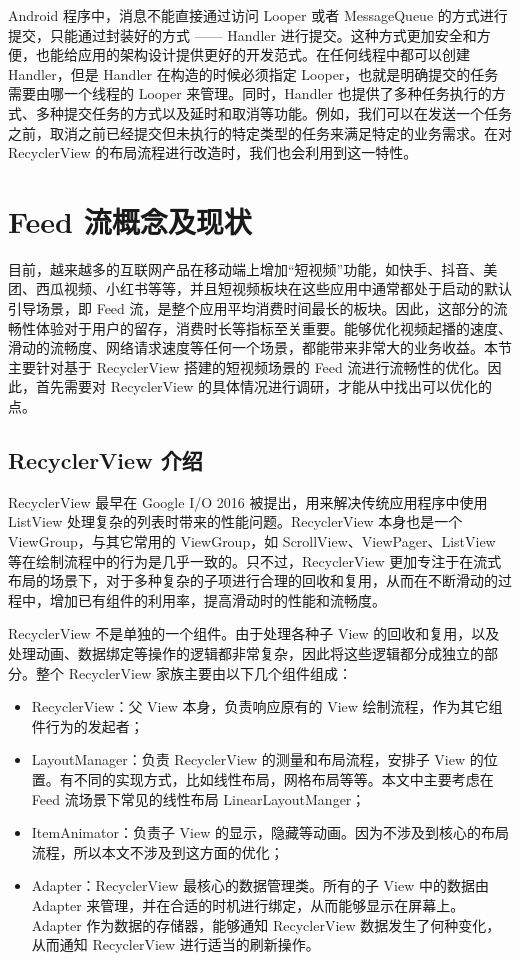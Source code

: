 Android 程序中，消息不能直接通过访问 Looper 或者 MessageQueue 的方式进行提交，只能通过封装好的方式 —— Handler 进行提交。这种方式更加安全和方便，也能给应用的架构设计提供更好的开发范式。在任何线程中都可以创建 Handler，但是 Handler 在构造的时候必须指定 Looper，也就是明确提交的任务需要由哪一个线程的 Looper 来管理\cite{fan2018efficiently}。同时，Handler 也提供了多种任务执行的方式、多种提交任务的方式以及延时和取消等功能。例如，我们可以在发送一个任务之前，取消之前已经提交但未执行的特定类型的任务来满足特定的业务需求。在对 RecyclerView 的布局流程进行改造时，我们也会利用到这一特性。

\section{Feed 流概念及现状}

目前，越来越多的互联网产品在移动端上增加“短视频”功能，如快手、抖音、美团、西瓜视频、小红书等等，并且短视频板块在这些应用中通常都处于启动的默认引导场景，即 Feed 流，是整个应用平均消费时间最长的板块\cite{谢新洲2019短视频火爆背后的问题分析}。因此，这部分的流畅性体验对于用户的留存，消费时长等指标至关重要。能够优化视频起播的速度、滑动的流畅度、网络请求速度等任何一个场景，都能带来非常大的业务收益。本节主要针对基于 RecyclerView 搭建的短视频场景的 Feed 流进行流畅性的优化。因此，首先需要对 RecyclerView 的具体情况进行调研，才能从中找出可以优化的点。

\subsection{RecyclerView 介绍}

RecyclerView 最早在 Google I/O 2016 被提出，用来解决传统应用程序中使用 ListView 处理复杂的列表时带来的性能问题。RecyclerView 本身也是一个 ViewGroup，与其它常用的 ViewGroup，如 ScrollView、ViewPager、ListView 等在绘制流程中的行为是几乎一致的\cite{mawlood2022listview}。只不过，RecyclerView 更加专注于在流式布局的场景下，对于多种复杂的子项进行合理的回收和复用，从而在不断滑动的过程中，增加已有组件的利用率，提高滑动时的性能和流畅度。

RecyclerView 不是单独的一个组件。由于处理各种子 View 的回收和复用，以及处理动画、数据绑定等操作的逻辑都非常复杂，因此将这些逻辑都分成独立的部分。整个 RecyclerView 家族主要由以下几个组件组成：

\begin{itemize}
    \item RecyclerView：父 View 本身，负责响应原有的 View 绘制流程，作为其它组件行为的发起者；
    \item LayoutManager：负责 RecyclerView 的测量和布局流程，安排子 View 的位置。有不同的实现方式，比如线性布局，网格布局等等。本文中主要考虑在 Feed 流场景下常见的线性布局 LinearLayoutManger；
    \item ItemAnimator：负责子 View 的显示，隐藏等动画。因为不涉及到核心的布局流程，所以本文不涉及到这方面的优化；
    \item Adapter：RecyclerView 最核心的数据管理类。所有的子 View 中的数据由 Adapter 来管理，并在合适的时机进行绑定，从而能够显示在屏幕上。Adapter 作为数据的存储器，能够通知 RecyclerView 数据发生了何种变化，从而通知 RecyclerView 进行适当的刷新操作。
\end{itemize}

